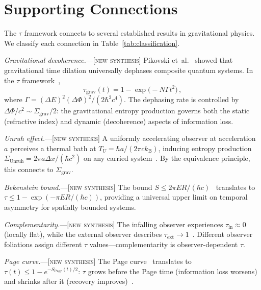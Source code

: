 \documentclass[prl,twocolumn,superscriptaddress,longbibliography,floatfix]{revtex4-2}
\newcommand{\kB}{k_{\mathrm{B}}}
\newcommand{\tauasym}{\tau}
\newcommand{\Sgrav}{\Sigma_{\mathrm{grav}}}
\begin{document}
\section{Supporting Connections}
\label{sec:connections}

The $\tauasym$ framework connects to several established
results in gravitational physics.
We classify each connection in Table~\ref{tab:classification}.

\emph{Gravitational decoherence.}---[\textsc{new synthesis}]
Pikovski et~al.~\cite{Pikovski2015} showed that gravitational
time dilation universally dephases composite quantum systems.
In the $\tauasym$ framework~\cite{Paper1b},
\begin{equation}
  \tauasym_{\mathrm{grav}}(t)
  = 1 - \exp\!\big(-N\Gamma t^2\big)\,,
  \label{eq:tau_pikovski}
\end{equation}
where $\Gamma = (\Delta E)^2(\Delta\Phi)^2/(2\hbar^2 c^4)$.
The dephasing rate is controlled by
$\Delta\Phi/c^2 \sim \Sgrav/2$: the gravitational entropy
production governs both the static (refractive index) and
dynamic (decoherence) aspects of information loss.

\emph{Unruh effect.}---[\textsc{new synthesis}]
A uniformly accelerating observer at acceleration $a$
perceives a thermal bath at $T_U = \hbar a/(2\pi c\kB)$,
inducing entropy production
$\Sigma_{\text{Unruh}} = 2\pi a\Delta x/(\hbar c^2)$
on any carried system~\cite{Unruh1976,LandiPaternostro2021}.
By the equivalence principle, this connects to $\Sgrav$.

\emph{Bekenstein bound.}---[\textsc{new synthesis}]
The bound $S \leq 2\pi ER/(\hbar c)$~\cite{Bekenstein1981}
translates to $\tauasym \leq 1 - \exp(-\pi ER/(\hbar c))$,
providing a universal upper limit on temporal asymmetry
for spatially bounded systems.

\emph{Complementarity.}---[\textsc{new synthesis}]
The infalling observer experiences
$\tauasym_{\text{in}} \approx 0$ (locally flat), while the
external observer describes
$\tauasym_{\text{ext}} \to 1$~\cite{Susskind1993}.
Different observer foliations assign different $\tauasym$
values---complementarity is observer-dependent $\tauasym$.

\emph{Page curve.}---[\textsc{new synthesis}]
The Page curve~\cite{Page1993} translates to
$\tauasym(t) \leq 1 - e^{-S_{\text{Page}}(t)/2}$:
$\tauasym$ grows before the Page time (information loss
worsens) and shrinks after it (recovery
improves)~\cite{Penington2020,AEMM2021}.
\end{document}
